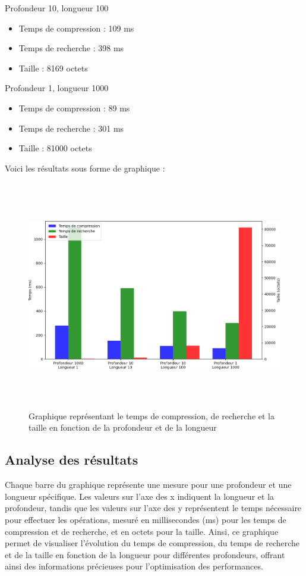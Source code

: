 \documentclass[a4paper,12pt]{article}
\begin{document}
Profondeur 10, longueur 100
\begin{itemize}
    \item Temps de compression : 109 ms
    \item Temps de recherche : 398 ms
    \item Taille : 8169 octets
\end{itemize}

Profondeur 1, longueur 1000
\begin{itemize}
    \item Temps de compression : 89 ms
    \item Temps de recherche : 301 ms
    \item Taille : 81000 octets
\end{itemize}
\newpage
Voici les résultats sous forme de graphique :
\begin{figure}[H]
\centering
\includegraphics[height=10cm]{img/graphique.png}
\caption{Graphique représentant le temps de compression, de recherche et la taille en fonction de la profondeur et de la longueur}
\end{figure}

\subsection{Analyse des résultats}
Chaque barre du graphique représente une mesure pour une profondeur et une longueur spécifique. Les valeurs sur l'axe des x indiquent la longueur et la profondeur, tandis que les valeurs sur l'axe des y représentent le temps nécessaire pour effectuer les opérations, mesuré en millisecondes (ms) pour les temps de compression et de recherche, et en octets pour la taille. Ainsi, ce graphique permet de visualiser l'évolution du temps de compression, du temps de recherche et de la taille en fonction de la longueur pour différentes profondeurs, offrant ainsi des informations précieuses pour l'optimisation des performances.\newline
\end{document}
